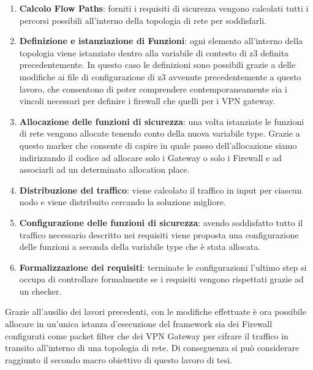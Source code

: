 \begin{enumerate}
    \item \textbf{Calcolo Flow Paths}: forniti i requisiti di sicurezza vengono calcolati tutti i percorsi possibili all'interno della topologia di rete per soddisfarli.
    \item \textbf{Definizione e istanziazione di Funzioni}: ogni elemento all'interno della topologia viene istanziato dentro alla variabile di contesto di z3 definita precedentemente. In questo
        caso le definizioni sono possibili grazie a delle modifiche ai file di configurazione di z3 avvenute precedentemente a questo lavoro, che consentono di poter comprendere contemporaneamente sia 
        i vincoli necessari per definire i firewall che quelli per i VPN gateway.
    \item \textbf{Allocazione delle funzioni di sicurezza}: una volta istanziate le funzioni di rete vengono allocate tenendo conto della nuova variabile type. Grazie a questo marker che consente di capire 
        in quale passo dell'allocazione siamo indirizzando il codice ad allocare solo i Gateway o solo i Firewall e ad associarli ad un determinato allocation place.
    \item \textbf{Distribuzione del traffico}: viene calcolato il traffico in input per ciascun nodo e viene distribuito cercando la soluzione migliore.
    \item \textbf{Configurazione delle funzioni di sicurezza}: avendo soddisfatto tutto il traffico necessario descritto nei requisiti viene proposta una configurazione delle funzioni a seconda della variabile type che è stata allocata.
    \item \textbf{Formalizzazione dei requisiti}: terminate le configurazioni l'ultimo step si occupa di controllare formalmente se i requisiti vengono rispettati grazie ad un checker.
\end{enumerate}

Grazie all'ausilio dei lavori precedenti, con le modifiche effettuate è ora possibile allocare in un'unica istanza d'esecuzione del framework sia dei Firewall configurati come packet filter che dei VPN Gateway per cifrare il traffico in transito
all'interno di una topologia di rete. Di conseguenza si può considerare raggiunto il secondo macro obiettivo di questo lavoro di tesi.